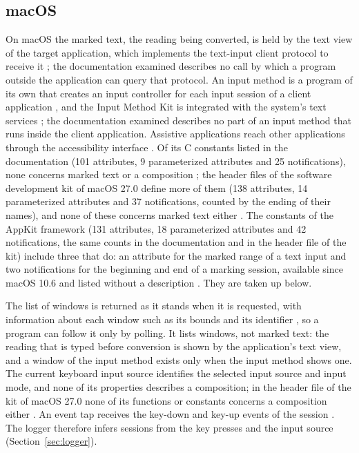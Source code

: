 \subsection{macOS}
\label{sec:observability-macos}

On macOS the marked text, the reading being converted, is held by the text view of the target application, which
implements the text-input client protocol to receive it \citep{apple-nstextinputclient}; the documentation examined
describes no call by which a program outside the application can query that protocol. An input method is a program of its own that creates an input
controller for each input session of a client application \citep{apple-imkinputcontroller}, and the Input Method Kit
is integrated with the system's text services \citep{apple-imk}; the documentation examined describes no part of an
input method that runs inside the client application. Assistive applications reach other applications through the accessibility interface
\citep{apple-axuielement}. Of its C constants listed in the documentation (101 attributes, 9 parameterized attributes
and 25 notifications), none concerns marked text or a composition
\citep{apple-ax-attributes,apple-ax-parameterized,apple-ax-notifications}; the header files of the software
development kit of macOS 27.0 define more of them (138 attributes, 14 parameterized attributes and 37 notifications,
counted by the ending of their names), and none of these concerns marked text either \citep{apple-sdk-27}. The
constants of the AppKit framework (131 attributes, 18 parameterized attributes and 42 notifications, the same counts
in the documentation and in the header file of the kit) include three that do: an attribute for the marked
range of a text input and two notifications for the beginning and end of a marking session, available since macOS
10.6 and listed without a description
\citep{apple-nsaccessibility-attribute,apple-nsaccessibility-parameterized,apple-nsaccessibility-notification}. They
are taken up below.

The list of windows is returned as it stands when it is requested, with information about each window such as its
bounds and its identifier \citep{apple-cgwindowlist}, so a program can follow it only by polling. It lists windows, not marked text: the reading
that is typed before conversion is shown by the application's text view, and a window of the input method exists only
when the input method shows one. The current keyboard input source \citep{apple-textinputsources} identifies the
selected input source and input mode, and none of its properties describes a composition; in the header file of
the kit of macOS 27.0 none of its functions or constants concerns a composition either \citep{apple-sdk-27}. An event tap receives the
key-down and key-up events of the session \citep{apple-cgevent-tapcreate}. The logger therefore infers sessions from
the key presses and the input source (Section~\ref{sec:logger}).


